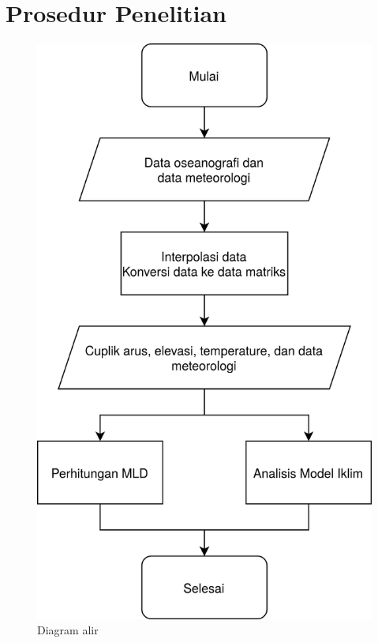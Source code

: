 \section[Prosedur Penelitian]{Prosedur Penelitian}
\begin{spacing}{1.5}
	\begin{figure}[H]
		\centering
		\includegraphics[width=15cm]{contents/flowchart.png}
		\caption{Diagram alir }
		\label{fig:flowchart}
	\end{figure}

\end{spacing}
